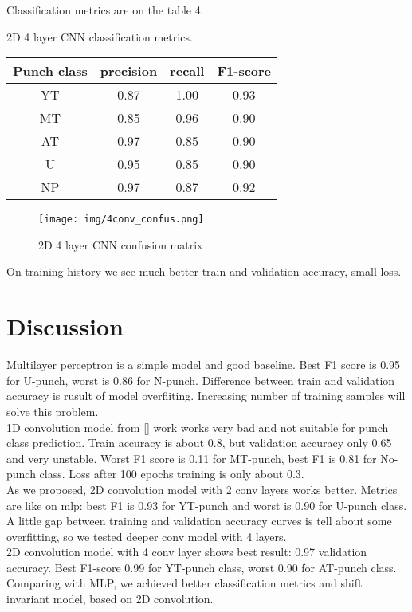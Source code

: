 \documentclass[sport,article,submit,moreauthors,pdftex]{Definitions/mdpi}
\begin{document}
Classification metrics are on the table 4.
\begin{specialtable}[H] 
\caption{2D 4 layer CNN classification metrics.\label{tab4}}
\begin{tabular}{cccc}
\toprule
\textbf{Punch class}	& \textbf{precision}	& \textbf{recall}	& \textbf{F1-score}\\
\midrule
YT		& 0.87		& 1.00		& 0.93 \\
MT		& 0.85		& 0.96		& 0.90 \\
AT		& 0.97		& 0.85		& 0.90 \\
U		& 0.95		& 0.85		& 0.90 \\
NP		& 0.97		& 0.87		& 0.92 \\
\bottomrule
\end{tabular}
\end{specialtable}

\begin{figure}[H]
\texttt{[image: img/4conv\_confus.png]}
\caption{2D 4 layer CNN confusion matrix}
\end{figure} 

On training history we see much better train and validation accuracy, small loss.


\section{Discussion}
Multilayer perceptron is a simple model and good baseline. Best F1 score is 0.95 for U-punch, worst is 0.86 for N-punch. Difference between train and validation accuracy is rusult of model overfiiting.
Increasing number of training samples will solve this problem.\\
1D convolution model from [] work works very bad and not suitable for punch class prediction. Train accuracy is about 0.8, but validation accuracy only 0.65 and very unstable. Worst F1 score is 0.11 for MT-punch, best F1 is 0.81 for No-punch class. Loss after 100 epochs training is only about 0.3.\\
As we proposed, 2D convolution model with 2 conv layers works better. Metrics are like on mlp: best F1 is 0.93 for YT-punch and worst is 0.90 for U-punch class. A little gap between training and validation accuracy curves is tell about some overfitting, so we tested deeper conv model with 4 layers.\\
2D convolution model with 4 conv layer shows best result: 0.97 validation accuracy. Best F1-score 0.99 for YT-punch class, worst 0.90 for AT-punch class.\\
Comparing with MLP, we achieved better classification metrics and shift invariant model, based on 2D convolution. 
\end{document}
